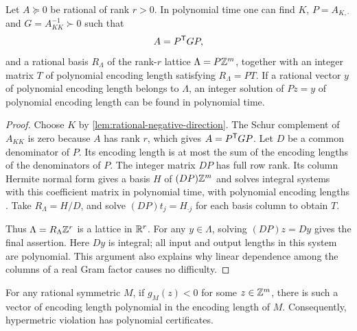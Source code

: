 \begin{lemma}\label{lem:rational-quotient}
Let $A\succeq0$ be rational of rank $r>0$. In polynomial time one can find
$K$, $P=A_{K,\cdot}$ and $G=A_{KK}^{-1}\succ0$ such that
\[
 A=P^{\mathsf T} GP,
\]
and a rational basis $R_\Lambda$ of the rank-$r$ lattice
$\Lambda=P\mathbb Z^m$, together with an integer matrix $T$ of polynomial
encoding length satisfying $R_\Lambda=PT$. If a rational vector $y$ of polynomial
encoding length belongs to $\Lambda$, an integer solution of $Pz=y$ of
polynomial encoding length can be found in polynomial time.
\end{lemma}

\begin{proof}
Choose $K$ by \cref{lem:rational-negative-direction}. The Schur complement
of $A_{KK}$ is zero because $A$ has rank $r$, which gives $A=P^{\mathsf T} GP$.
Let $D$ be a common denominator of $P$. Its encoding length is at most the
sum of the encoding lengths of the denominators of $P$. The integer
matrix $DP$ has full row rank. Its column Hermite normal form gives a
basis $H$ of $(DP)\mathbb Z^m$ and solves integral systems with this coefficient
matrix in polynomial time, with polynomial encoding lengths
\citep{KannanBachem1979}. Take $R_\Lambda=H/D$, and solve
$(DP)t_j=H_{\cdot j}$ for each basis column to obtain $T$.

Thus $\Lambda=R_\Lambda\mathbb Z^r$ is a lattice in $\mathbb R^r$. For any $y\in\Lambda$,
solving $(DP)z=Dy$ gives the final assertion. Here $Dy$ is integral; all
input and output lengths in this system are polynomial. This argument
also explains why linear dependence among the columns of a real Gram
factor causes no difficulty.
\end{proof}

\begin{lemma}\label{lem:short-hypermetric-witness}
For any rational symmetric $M$, if $g_M(z)<0$ for some $z\in\mathbb Z^m$, there
is such a vector of encoding length polynomial in the encoding length of
$M$. Consequently, hypermetric violation has polynomial certificates.
\end{lemma}

